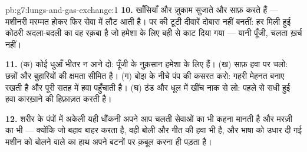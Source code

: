 \begin{solution}{pb:g7:lungs-and-gas-exchange:1}
\textbf{10.} खाँसियाँ और ज़ुकाम सुजाते और साफ़ करते हैं --- मशीनरी
मरम्मत होकर फिर सेवा में लौट आती है। पर  की टूटी दीवारें दोबारा
नहीं बनतीं: हर मिली हुई कोठरी अदला-बदली का वह रक़बा है जो हमेशा के लिए
बही से काट दिया गया --- यानी पूँजी, चलता ख़र्च नहीं।

\textbf{11.} (क) कोई धुआँ भीतर न आने दो: पूँजी के नुक़सान हमेशा के लिए
हैं। (ख) साफ़ हवा पर चलो: छन्नों और बुहारियों की क्षमता सीमित है। (ग)
बोझ के नीचे पंप की कसरत करो: गहरी मेहनत  बनाए रखती है और पूरी सतह
में हवा पहुँचाती है। (घ) ठंड और धूल में खींच नाक से लो: पहले से सधी हुई
हवा कारख़ाने की हिफ़ाज़त करती है।

\textbf{12.} शरीर के पंपों में अकेली यही धौंकनी अपने आप चलती सेवाओं का
भी कहना मानती है और मरज़ी का भी --- क्योंकि जो बहाव 
बाहर करता है, वही बोली और गीत की हवा भी है, और भाषा को उधार दी गई मशीन
को बोलने वाले का हाथ अपने बटनों पर क़बूल करना ही पड़ता है।
\end{solution}
